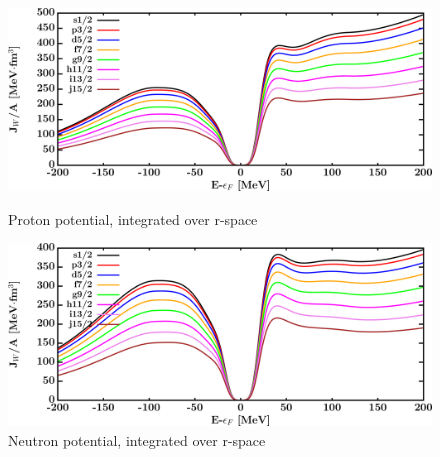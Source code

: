 \begin{figure}[H]
    \centering
    \begin{minipage}{0.45\textwidth}
        \centering
        \includegraphics[width=1.0\textwidth]{figures/ni64_protonVolumeIntegrals.png}
        \caption{Proton potential, integrated over r-space}
        \label{DOMFitData_ni64_proton_potentialIntegral}
    \end{minipage}\hfill
    \begin{minipage}{0.45\textwidth}
        \centering
        \includegraphics[width=1.0\textwidth]{figures/ni64_neutronVolumeIntegrals.png}
        \caption{Neutron potential, integrated over r-space}
        \label{DOMFitData_ni64_neutron_potentialIntegral}
    \end{minipage}
\end{figure}

\afterpage{\clearpage}

